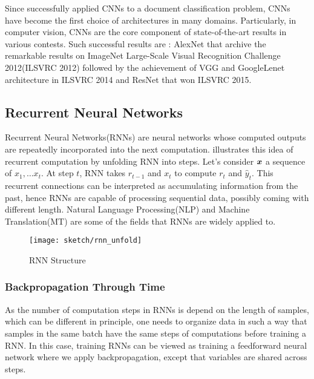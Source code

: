 Since \cite{LeCunGradientBasedLearningApplied2001} successfully applied CNNs to a document classification problem, CNNs have become the first choice of architectures in many domains. Particularly, in computer vision, CNNs are the core component of state-of-the-art results in various contests. Such successful results are :  AlexNet\cite{KrizhevskyImageNetClassificationDeep2012} that archive the remarkable results on  ImageNet Large-Scale Visual Recognition Challenge 2012(ILSVRC 2012) followed by the achievement of VGG\cite{SimonyanVeryDeepConvolutional2014} and GoogleLenet \cite{SzegedyGoingDeeperConvolutions2014} architecture in ILSVRC 2014 and ResNet\cite{HeDeepResidualLearning2015} that won ILSVRC 2015.



\subsection{Recurrent Neural Networks}
Recurrent Neural Networks(RNNs) are neural networks whose computed outputs   are repeatedly incorporated into the next computation. \addfigure{\ref{fig:rnn_unfold}} illustrates this idea of recurrent computation by unfolding RNN into steps. Let's consider $\boldsymbol{x}$ a sequence of $x_1, \dots x_t$.  At step $t$, RNN takes $r_{t-1}$ and $x_{t}$ to compute $r_{t}$ and $\hat{y}_t$. This recurrent connections can be interpreted as accumulating information from the past, hence RNNs are capable of processing sequential data, possibly  coming with different length. Natural Language Processing(NLP) and Machine Translation(MT) are some of the fields that RNNs are widely applied to.

\begin{figure}[h]
\centering
\texttt{[image: sketch/rnn\_unfold]}
\caption{RNN Structure} %

\label{fig:rnn_unfold} 
\end{figure}

\subsubsection{Backpropagation Through Time}
As the number of computation steps in RNNs is depend on the length of samples, which can be different in principle, one needs to organize data in such a way that samples in the same batch have the same steps of computations before training a RNN. In this case, training RNNs can be viewed as training a feedforward neural network where we apply backpropagation,  except that variables are shared across steps. 

